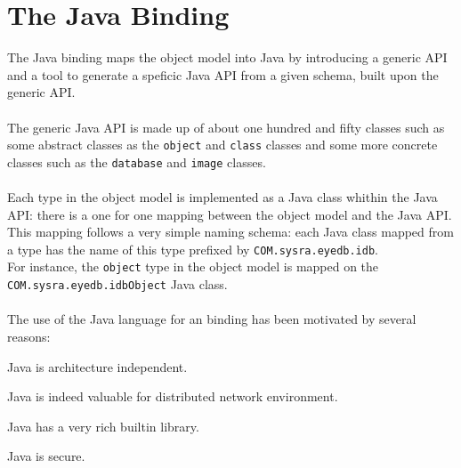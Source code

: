 

\newcommand{\mantitle}{\textsc{Java Binding}}


\tableofcontents

\chapter{The Java Binding}


The Java binding maps the \eyedb object model into Java by introducing
a generic API
and a tool to generate a speficic Java API from a given schema,
built upon the generic API.
\\
\\
The generic Java API is made up of about one hundred and fifty classes such
as some abstract classes as the \texttt{object} and \texttt{class} classes
and some more concrete classes such as the \texttt{database} and \texttt{image}
classes.
\\
\\
Each type in the \eyedb object model is implemented as a Java class whithin
the Java API: there is a one for one mapping between the object model and
the Java API.
\\
This mapping follows a very simple naming schema: each Java class mapped from
a type has the name of this type prefixed by \texttt{COM.sysra.eyedb.idb}.
\\
For instance, the \texttt{object} type in the \eyedb object model is
mapped on the \texttt{COM.sysra.eyedb.idbObject} Java class.
\\
\\
The use of the Java language for an \eyedb binding has been motivated by
several reasons:
\bi
\item Java is architecture independent.
\item Java is indeed valuable for distributed network environment.
\item Java has a very rich builtin library.
\item Java is secure.
